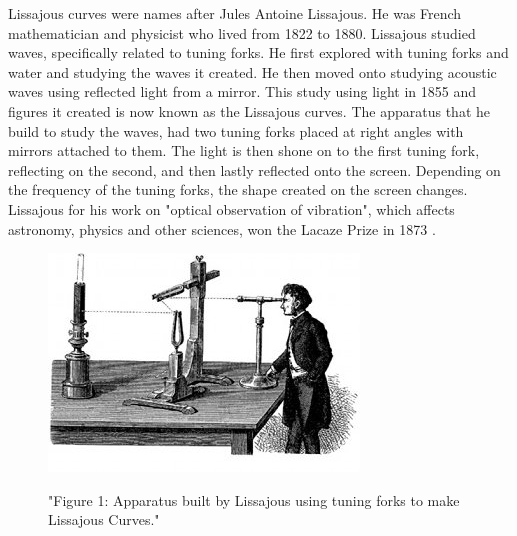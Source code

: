 Lissajous curves were names after Jules Antoine Lissajous. He was French mathematician and physicist who lived from 1822 to 1880. Lissajous studied waves, specifically related to tuning forks. He first explored with tuning forks and water and studying the waves it created. He then moved onto studying acoustic waves using reflected light from a mirror. This study using light in 1855 and figures it created is now known as the Lissajous curves. The apparatus that he build to study the waves, had two tuning forks placed at right angles with mirrors attached to them. The light is then shone on to the first tuning fork, reflecting on the second, and then lastly reflected onto the screen. Depending on the frequency of the tuning forks, the shape created on the screen changes.  Lissajous for his work on "optical observation of vibration", which affects astronomy, physics and other sciences, won the Lacaze Prize in 1873 \cite{JulesAntoineLissajous}.
\begin{figure}[h]
    \centering
    \includegraphics[scale=0.75]{Images/lissajous_obs.jpg}
    \cite{LissajousFigures}
    \caption{"Figure 1: Apparatus built by Lissajous using tuning forks to make Lissajous Curves."}
    \label{fig:my_label}
\end{figure}

